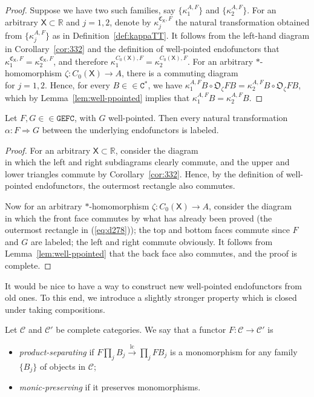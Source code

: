 \documentclass[10pt]{simplearticle}
\newcommand{\tikzinput}[1]{}
\newcommand{\GEFC}{\mathbb{\mathtt{GEFC}}}
\newcommand{\Cstar}{\mathtt{C^{*}}}
\newcommand{\C}{\mathfrak{C}^{\,}}
\newcommand{\lc}{\operatorname{lc}}
\begin{document}
\begin{proof}
Suppose we have two such families, say $\{\kappa^{A,F}_{1}\}$ and
$\{\kappa^{A,F}_{2}\}$. For an arbitrary $\mathsf{X}\subset\mathbb{R}$
and $j=1,2$, denote by $\kappa^{\C_{\mathsf{X}},F}_{j}$ the natural
transformation obtained from $\{\kappa^{A,F}_{j}\}$ as in Definition~\ref{def:kappaTT}.
It follows from the left-hand diagram in Corollary~\ref{cor:332}
and the definition of well-pointed endofunctors that $\kappa^{\C_{\mathsf{X}},F}_{1}=\kappa^{\C_{\mathsf{X}},F}_{2}$,
and therefore $\kappa^{C_{0}(\mathsf{X}),F}_{1}=\kappa^{C_{0}(\mathsf{X}),F}_{2}$.
For an arbitrary $*$-homomorphism $\zeta\colon C_{0}(\mathsf{X})\to A$,
there is a commuting diagram
\[
\tikzinput{d274}
\]
for $j=1,2$. Hence, for every $B\in\in\Cstar$, we have $\kappa^{A,F}_{1}B\circ\mathfrak{O}_{\zeta}FB=\kappa^{A,F}_{2}B\circ\mathfrak{O}_{\zeta}FB$,
which by Lemma~\ref{lem:well-ppointed} implies that $\kappa^{A,F}_{1}B=\kappa^{A,F}_{2}B$.
\end{proof}

\begin{prop}\label{prop:wp-lbl}
Let $F,G\in\in\GEFC$, with $G$ well-pointed.
Then every natural transformation $\alpha\colon F\Rightarrow G$ between
the underlying endofunctors is labeled.
\end{prop}

\begin{proof}
For an arbitrary $\mathsf{X}\subset\mathbb{R}$, consider the diagram
\begin{equation}
\tikzinput{d278}\label{eq:d278}
\end{equation}
in which the left and right subdiagrams clearly commute, and the upper
and lower triangles commute by Corollary~\ref{cor:332}. Hence, by
the definition of well-pointed endofunctors, the outermost rectangle
also commutes.

Now for an arbitrary $*$-homomorphism $\zeta\colon C_{0}(\mathsf{X})\to A$,
consider the diagram
\[
\tikzinput{d279}
\]
in which the front face commutes by what has already been proved (the
outermost rectangle in (\ref{eq:d278})); the top and bottom faces
commute since $F$ and $G$ are labeled; the left and right commute
obviously. It follows from Lemma~\ref{lem:well-ppointed} that the
back face also commutes, and the proof is complete.
\end{proof}

It would be nice to have a way to construct new well-pointed endofunctors
from old ones. To this end, we introduce a slightly stronger property
which is closed under taking compositions.
\begin{defn}
Let $\mathcal{C}$ and $\mathcal{C}'$ be complete categories. We
say that a functor $F\colon\mathcal{C}\to\mathcal{C}'$ is
\begin{itemize}
\item \emph{product-separating} if $F\prod_{j}B_{j}\xrightarrow{\lc}\prod_{j}FB_{j}$
is a monomorphism for any family $\{B_{j}\}$ of objects in $\mathcal{C}$;
\item \emph{monic-preserving} if it preserves monomorphisms.
\end{itemize}
\end{defn}
\end{document}
